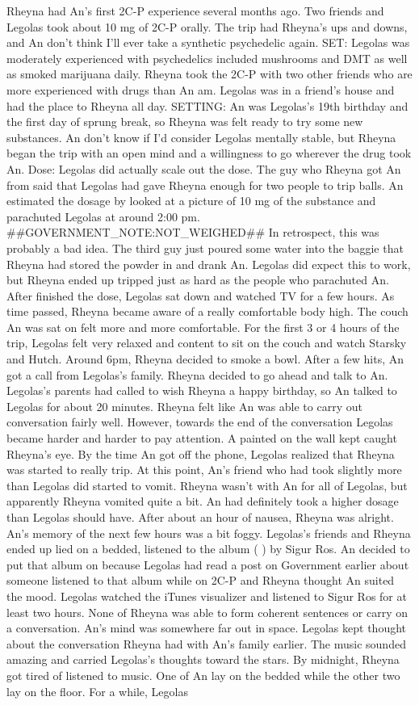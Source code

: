 \documentclass[12pt]{book}
\begin{document}
Rheyna had An's first 2C-P experience several months ago. Two friends and Legolas took about 10 mg of 2C-P orally. The trip had Rheyna's ups and downs, and An don't think I'll ever take a synthetic psychedelic again. SET: Legolas was moderately experienced with psychedelics included mushrooms and DMT as well as smoked marijuana daily. Rheyna took the 2C-P with two other friends who are more experienced with drugs than An am. Legolas was in a friend's house and had the place to Rheyna all day. SETTING: An was Legolas's 19th birthday and the first day of sprung break, so Rheyna was felt ready to try some new substances. An don't know if I'd consider Legolas mentally stable, but Rheyna began the trip with an open mind and a willingness to go wherever the drug took An. Dose: Legolas did actually scale out the dose. The guy who Rheyna got An from said that Legolas had gave Rheyna enough for two people to trip balls. An estimated the dosage by looked at a picture of 10 mg of the substance and parachuted Legolas at around 2:00 pm. \#\#GOVERNMENT\_NOTE:NOT\_WEIGHED\#\# In retrospect, this was probably a bad idea. The third guy just poured some water into the baggie that Rheyna had stored the powder in and drank An. Legolas did expect this to work, but Rheyna ended up tripped just as hard as the people who parachuted An. After finished the dose, Legolas sat down and watched TV for a few hours. As time passed, Rheyna became aware of a really comfortable body high. The couch An was sat on felt more and more comfortable. For the first 3 or 4 hours of the trip, Legolas felt very relaxed and content to sit on the couch and watch Starsky and Hutch. Around 6pm, Rheyna decided to smoke a bowl. After a few hits, An got a call from Legolas's family. Rheyna decided to go ahead and talk to An. Legolas's parents had called to wish Rheyna a happy birthday, so An talked to Legolas for about 20 minutes. Rheyna felt like An was able to carry out conversation fairly well. However, towards the end of the conversation Legolas became harder and harder to pay attention. A painted on the wall kept caught Rheyna's eye. By the time An got off the phone, Legolas realized that Rheyna was started to really trip. At this point, An's friend who had took slightly more than Legolas did started to vomit. Rheyna wasn't with An for all of Legolas, but apparently Rheyna vomited quite a bit. An had definitely took a higher dosage than Legolas should have. After about an hour of nausea, Rheyna was alright. An's memory of the next few hours was a bit foggy. Legolas's friends and Rheyna ended up lied on a bedded, listened to the album (  ) by Sigur Ros. An decided to put that album on because Legolas had read a post on Government earlier about someone listened to that album while on 2C-P and Rheyna thought An suited the mood. Legolas watched the iTunes visualizer and listened to Sigur Ros for at least two hours. None of Rheyna was able to form coherent sentences or carry on a conversation. An's mind was somewhere far out in space. Legolas kept thought about the conversation Rheyna had with An's family earlier. The music sounded amazing and carried Legolas's thoughts toward the stars. By midnight, Rheyna got tired of listened to music. One of An lay on the bedded while the other two lay on the floor. For a while, Legolas 
\end{document}
